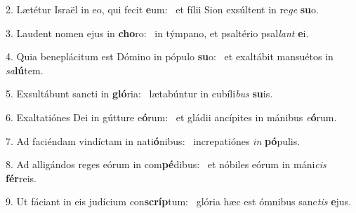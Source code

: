 2. Lætétur Israël in eo, qui fecit \textbf{e}um: \ast\  et fílii Sion exsúltent in re\textit{ge} \textbf{su}o.\

3. Laudent nomen ejus in \textbf{cho}ro: \ast\  in týmpano, et psaltério psal\textit{lant} \textbf{e}i.\

4. Quia beneplácitum est Dómino in pópulo \textbf{su}o: \ast\  et exaltábit mansuétos in \textit{sa}\textbf{lú}tem.\

5. Exsultábunt sancti in \textbf{gló}ria: \ast\  lætabúntur in cubíli\textit{bus} \textbf{su}is.\

6. Exaltatiónes Dei in gútture e\textbf{ó}rum: \ast\  et gládii ancípites in mánibus \textit{e}\textbf{ó}rum.\

7. Ad faciéndam vindíctam in nati\textbf{ó}nibus: \ast\  increpatiónes \textit{in} \textbf{pó}pulis.\

8. Ad alligándos reges eórum in com\textbf{pé}dibus: \ast\  et nóbiles eórum in máni\textit{cis} \textbf{fér}reis.\

9. Ut fáciant in eis judícium con\textbf{scríp}tum: \ast\  glória hæc est ómnibus sanc\textit{tis} \textbf{e}jus.\

